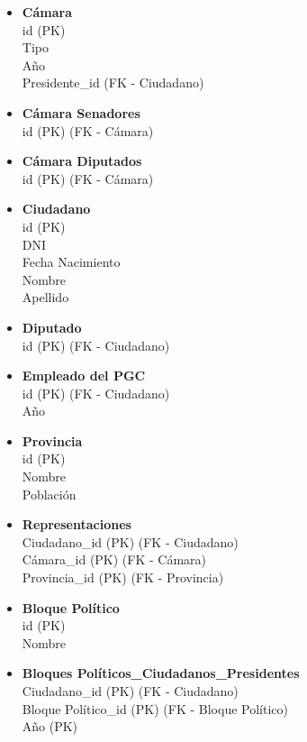 \begin{itemize}
	\item \textbf{Cámara} \\
	id (PK) \\
	Tipo \\
	Año \\
	Presidente\_id (FK - Ciudadano)
	
	\item \textbf{Cámara Senadores} \\
	id (PK) (FK - Cámara) 
	
	\item \textbf{Cámara Diputados} \\
	id (PK) (FK - Cámara)
	
	\item \textbf{Ciudadano} \\
	id (PK) \\
	DNI \\
	Fecha Nacimiento \\
	Nombre \\
	Apellido
	
	\item \textbf{Diputado} \\
	id (PK) (FK - Ciudadano)
	
	\item \textbf{Empleado del PGC} \\
	id (PK) (FK - Ciudadano) \\
	Año
	
	\item \textbf{Provincia} \\
	id (PK) \\
	Nombre \\
	Población
	
	\item \textbf{Representaciones} \\
	Ciudadano\_id (PK) (FK - Ciudadano) \\
	Cámara\_id (PK) (FK - Cámara) \\
	Provincia\_id (PK) (FK - Provincia) 
		
	\item \textbf{Bloque Político} \\
	id (PK) \\
	Nombre
	
	\item \textbf{Bloques Políticos\_Ciudadanos\_Presidentes} \\
	Ciudadano\_id (PK) (FK - Ciudadano) \\
	Bloque Político\_id (PK) (FK - Bloque Político)\\
	Año (PK)
	

\end{itemize}
